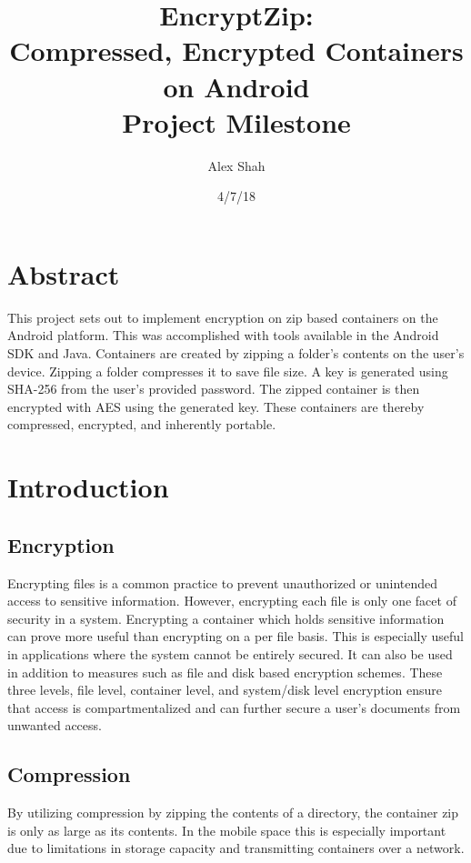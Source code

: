\documentclass[10pt,a4paper]{article}
\begin{document}
\title{EncryptZip: \\ Compressed, Encrypted Containers on Android \\ Project Milestone}
\author{Alex Shah}
\date{4/7/18}

\maketitle

\section{Abstract}
This project sets out to implement encryption on zip based containers on the Android platform. This was accomplished with tools available in the Android SDK and Java. Containers are created by zipping a folder's contents on the user's device. Zipping a folder compresses it to save file size. A key is generated using SHA-256 from the user's provided password. The zipped container is then encrypted with AES using the generated key. These containers are thereby compressed, encrypted, and inherently portable.

\section{Introduction}

\subsection{Encryption}
Encrypting files is a common practice to prevent unauthorized or unintended access to sensitive information. However, encrypting each file is only one facet of security in a system. Encrypting a container which holds sensitive information can prove more useful than encrypting on a per file basis. This is especially useful in applications where the system cannot be entirely secured. It can also be used in addition to measures such as file and disk based encryption schemes. These three levels, file level, container level, and system/disk level encryption ensure that access is compartmentalized and can further secure a user's documents from unwanted access. 

\subsection{Compression}
By utilizing compression by zipping the contents of a directory, the container zip is only as large as its contents. In the mobile space this is especially important due to limitations in storage capacity and transmitting containers over a network.
\end{document}
